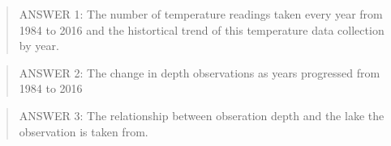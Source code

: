 \documentclass[]{article}
\begin{document}
\begin{quote}
ANSWER 1: The number of temperature readings taken every year from 1984
to 2016 and the histortical trend of this temperature data collection by
year.
\end{quote}

\begin{quote}
ANSWER 2: The change in depth observations as years progressed from 1984
to 2016
\end{quote}

\begin{quote}
ANSWER 3: The relationship between obseration depth and the lake the
observation is taken from.
\end{quote}
\end{document}
